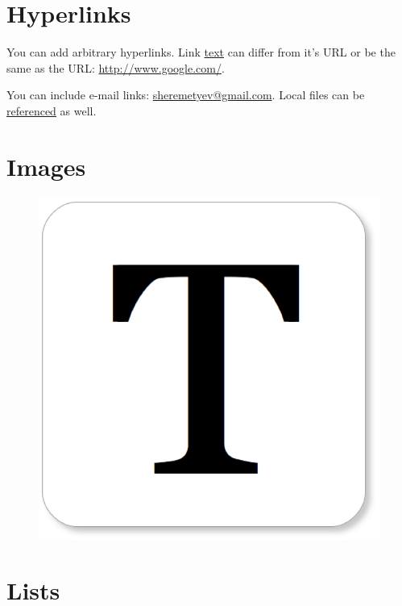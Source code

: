 \documentclass[10pt]{article}
\begin{document}
\section{Hyperlinks}

You can add arbitrary hyperlinks. Link \href{http://www.texts.io/}{text} can
differ from it's URL or be the same as the URL: \url{http://www.google.com/}.

You can include e-mail links:
\href{mailto:sheremetyev@gmail.com}{sheremetyev@gmail.com}. Local files can be
\href{run:basic.pdf}{referenced} as well.

\section{Images}

\begin{figure}[H]
\centering
\includegraphics{Texts_Logo.png}
\end{figure}

\section{Lists}
\end{document}
